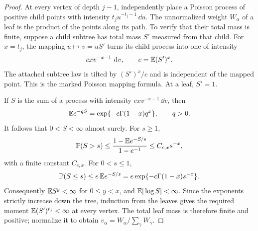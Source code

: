 \begin{proof}
At every vertex of depth $j-1$, independently place a Poisson process of
positive child points with intensity $t_j u^{-t_j-1}\,\dd u$.  The
unnormalized weight $W_\alpha$ of a leaf is the product of the points along
its path.  To verify that their total mass is finite, suppose a child subtree
has total mass $S'$ measured from that child.  For $x=t_j$, the mapping
$u\mapsto v=uS'$ turns its child process into one of intensity
\[
 cxv^{-x-1}\,\,\mathrm d v,\qquad c=\mathbb E(S')^x.
\]
The attached subtree law is tilted by $(S')^x/c$ and is independent of
the mapped point.  This is the marked Poisson mapping formula.  At a leaf,
$S'=1$.

If $S$ is the sum of a process with intensity $cxv^{-x-1}\,\dd v$, then
\begin{equation}
 \mathbb E e^{-qS}=\exp\{-c\Gamma(1-x)q^x\},\qquad q>0.
 \label{ctr:stable-transform}
\end{equation}
It follows that $0<S<\infty$ almost surely.  For $s\ge1$,
\[
 \mathbb P(S>s)\le
 \frac{1-\mathbb E e^{-S/s}}{1-e^{-1}}\le C_{c,x}s^{-x},
\]
with a finite constant $C_{c,x}$.  For $0<s\le1$,
\[
 \mathbb P(S\le s)\le e\,\mathbb E e^{-S/s}
   =e\exp\{-c\Gamma(1-x)s^{-x}\}.
\]
Consequently $\mathbb E S^y<\infty$ for $0\le y<x$, and $\mathbb E|\log S|<\infty$.
Since the exponents strictly increase down the tree, induction from the
leaves gives the required moment $\mathbb E(S')^{t_j}<\infty$ at every vertex.
The total leaf mass is therefore finite and positive; normalize it to
obtain $v_\alpha=W_\alpha/\sum_\gamma W_\gamma$.


\end{proof}
